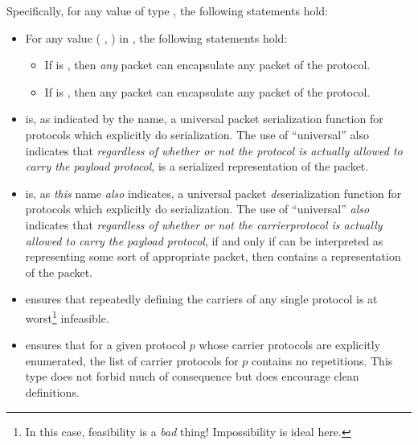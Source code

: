 \documentclass{report}
\begin{document}
Specifically, for any value  of type  , the following statements hold:
\begin{itemize}
  \item For any value \AgdaSymbol( \AgdaSymbol , \AgdaSymbol) in  , the following statements hold:
  \begin{itemize}
    \item If  is , then \emph{any} packet can encapsulate any packet of the  protocol.
    \item If  is  , then any  packet can encapsulate any packet of the  protocol.
  \end{itemize}
  \item {}  is, as indicated by the name, a universal packet serialization function for protocols which explicitly do serialization.  The use of ``universal'' also indicates that \emph{regardless of whether or not the  protocol is actually allowed to carry the payload protocol},  \AgdaUnderscore{}  \AgdaUnderscore{} \AgdaUnderscore{} \AgdaUnderscore{} is a serialized representation of the  packet.
  \item {}  is, as \emph{this} name \emph{also} indicates, a universal packet \emph{de}serialization function for protocols which explicitly do serialization.  The use of ``universal'' \emph{also} indicates that \emph{regardless of whether or not the carrierprotocol is actually allowed to carry the payload protocol}, if and only if  can be interpreted as representing some sort of appropriate packet, then  \AgdaUnderscore{}  contains a representation of the  packet.
  \item {}  ensures that repeatedly defining the carriers of any single protocol is at worst\footnote{In this case, feasibility is a \emph{bad} thing!  Impossibility is ideal here.} infeasible.
  \item {}  ensures that for a given protocol \(p\) whose carrier protocols are explicitly enumerated, the list of carrier protocols for \(p\) contains no repetitions.   This type does not forbid much of consequence but does encourage clean definitions.

\end{itemize}
\end{document}
